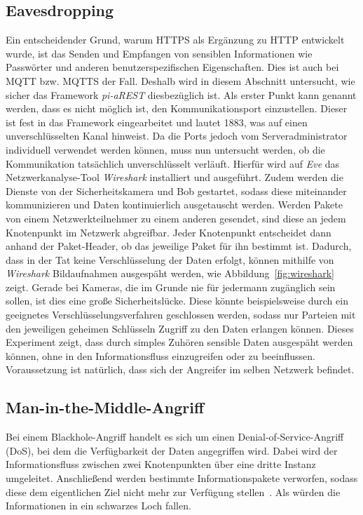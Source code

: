 \subsection{Eavesdropping}
Ein entscheidender Grund, warum HTTPS als Ergänzung zu HTTP entwickelt wurde,
ist das Senden und Empfangen von sensiblen Informationen wie Passwörter und
anderen benutzerspezifischen Eigenschaften. Dies ist auch bei MQTT bzw. MQTTS
der Fall. Deshalb wird in diesem Abschnitt untersucht, wie sicher das Framework
\textit{pi-aREST} diesbezüglich ist. Als erster Punkt kann genannt werden, dass
es nicht möglich ist, den Kommunikationsport einzustellen. Dieser ist fest in
das Framework eingearbeitet und lautet 1883, was auf einen unverschlüsselten
Kanal hinweist. Da die Ports jedoch vom Serveradministrator individuell
verwendet werden können, muss nun untersucht werden, ob die Kommunikation
tatsächlich unverschlüsselt verläuft. Hierfür wird auf \textit{Eve} das
Netzwerkanalyse-Tool \textit{Wireshark} installiert und ausgeführt. Zudem werden
die Dienste von der Sicherheitskamera und Bob gestartet, sodass diese
miteinander kommunizieren und Daten kontinuierlich ausgetauscht werden. Werden
Pakete von einem Netzwerkteilnehmer zu einem anderen gesendet, sind diese an
jedem Knotenpunkt im Netzwerk abgreifbar. Jeder Knotenpunkt entscheidet dann
anhand der Paket-Header, ob das jeweilige Paket für ihn bestimmt ist. Dadurch,
dass in der Tat keine Verschlüsselung der Daten erfolgt, können mithilfe von
\textit{Wireshark} Bildaufnahmen ausgespäht werden, wie
Abbildung~\ref{fig:wireshark} zeigt. Gerade bei Kameras, die im Grunde nie für
jedermann zugänglich sein sollen, ist dies eine große Sicherheitslücke. Diese
könnte beispielsweise durch ein geeignetes Verschlüsselungsverfahren geschlossen
werden, sodass nur Parteien mit den jeweiligen geheimen Schlüsseln Zugriff zu
den Daten erlangen können. Dieses Experiment zeigt, dass durch simples Zuhören
sensible Daten ausgespäht werden können, ohne in den Informationsfluss
einzugreifen oder zu beeinflussen. Voraussetzung ist natürlich, dass sich der
Angreifer im selben Netzwerk befindet.

\subsection{Man-in-the-Middle-Angriff}
Bei einem Blackhole-Angriff handelt es sich um einen Denial-of-Service-Angriff
(DoS), bei dem die Verfügbarkeit der Daten angegriffen wird. Dabei wird der
Informationsfluss zwischen zwei Knotenpunkten über eine dritte Instanz
umgeleitet. Anschließend werden bestimmte Informationspakete verworfen, sodass
diese dem eigentlichen Ziel nicht mehr zur Verfügung stellen~\cite{aad2004}. Als
würden die Informationen in ein schwarzes Loch fallen.

